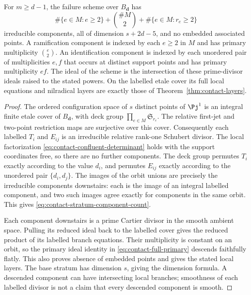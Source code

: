 \begin{corollary}
\label{cor:contact-multiplicity-strata}
For $m\ge d-1$, the failure scheme over $B_{\boldsymbol d}$ has
\begin{equation}\label{eq:contact-stratum-component-count}
 \#\{e\in M:e\ge2\}+\binom{\#M}{2}
                         +\#\{e\in M:r_e\ge2\}
\end{equation}
irreducible components, all of dimension $s+2d-5$, and no embedded
associated points. A ramification component is indexed by each
$e\ge2$ in $M$ and has primary multiplicity $\binom e2$. An
identification component is indexed by each unordered pair of
multiplicities $e,f$ that occurs at distinct support points and has
primary multiplicity $ef$. The ideal of the scheme is the
intersection of these prime-divisor ideals raised to the stated
powers. On the labelled etale cover its full local equations and
nilradical layers are exactly those of
Theorem~\ref{thm:contact-layers}.
\end{corollary}
\begin{proof}
The ordered configuration space of $s$ distinct points of $\Pj^1$
is an integral finite etale cover of $B_{\boldsymbol d}$, with
deck group $\prod_{e\in M}\mathfrak S_{r_e}$. The relative
first-jet and two-point restriction maps are surjective over this
cover. Consequently each labelled $T_i$ and $E_{ij}$ is an
irreducible relative rank-one Schubert divisor. The local
factorization \eqref{eq:contact-confluent-determinant} holds with
the support coordinates free, so there are no further components.
The deck group permutes $T_i$ exactly according to the value $d_i$,
and permutes $E_{ij}$ exactly according to the unordered pair
$\{d_i,d_j\}$. The images of the orbit unions are precisely the
irreducible components downstairs: each is the image of an integral
labelled component, and two such images agree exactly for components
in the same orbit. This gives \eqref{eq:contact-stratum-component-count}.

Each component downstairs is a prime Cartier divisor in the smooth
ambient space. Pulling its reduced ideal back to the labelled cover
gives the reduced product of its labelled branch equations. Their
multiplicity is constant on an orbit, so the primary ideal identity
in \eqref{eq:contact-full-primary} descends faithfully flatly. This
also proves absence of embedded points and gives the stated local
layers. The base stratum has dimension $s$, giving the dimension
formula. A descended component can have intersecting local branches;
smoothness of each labelled divisor is not a claim that every
descended component is smooth.
\end{proof}

